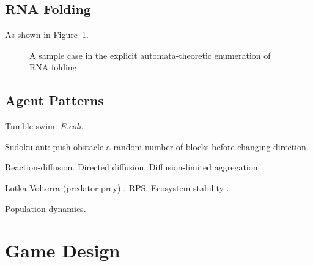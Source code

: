 \documentclass{acm_proc_article-sp}
\begin{document}
\subsection{RNA Folding}

\cite{LeoniVanderzande2003,JostEveraers2010,ZaraPretti2007,GillespieMayneJiang2009}


As shown in Figure~\ref{fig:rna}.

\begin{figure}
\caption{
\label{fig:rna}
A sample case in the explicit automata-theoretic enumeration of RNA folding.
}
\end{figure}

\cite{Durbin98}

\subsection{Agent Patterns}

Tumble-swim: {\em E.coli}.
\cite{EcoliTumbleRoll}

Sudoku ant: push obstacle a random number of blocks before changing direction.
\cite{AntBehaviorNature}

Reaction-diffusion.
Directed diffusion.
Diffusion-limited aggregation.
\cite{DLA}

Lotka-Volterra (predator-prey) \cite{LotkaVolterra,SpatialLotkaVolterra}. RPS.
Ecosystem stability \cite{Quince}.

Population dynamics. \cite{WrightFisher}

\section{Game Design}
\end{document}
